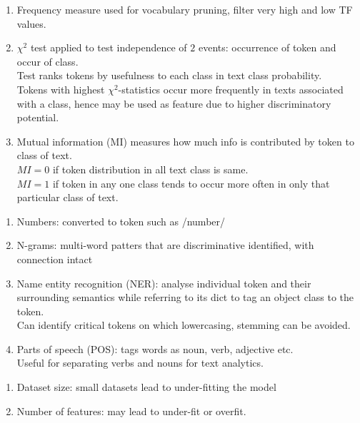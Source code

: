 \begin{remark} 
\begin{enumerate}[label=\roman*.]
\setlength{\itemsep}{0pt}
\item Frequency measure used for vocabulary pruning, filter very high and low TF values.
\item $\chi^2$ test applied to test independence of $2$ events: occurrence of token and occur of class.\\
Test ranks tokens by usefulness to each class in text class probability.\\
Tokens with highest $\chi^2$-statistics occur more frequently in texts associated with a class, hence may be used as feature due to higher discriminatory potential.
\item Mutual information (MI) measures how much info is contributed by token to class of text.\\
$MI = 0$ if token distribution in all text class is same.\\
$MI = 1$ if token in any one class tends to occur more often in only that particular class of text.
\end{enumerate}
\end{remark}

\begin{remark} 
\begin{enumerate}[label=\roman*.]
\setlength{\itemsep}{0pt}
\item Numbers: converted to token such as /number/
\item N-grams: multi-word patters that are discriminative identified, with connection intact
\item Name entity recognition (NER): analyse individual token and their surrounding semantics while referring to its dict to tag an object class to the token.\\
Can identify critical tokens on which lowercasing, stemming can be avoided.
\item Parts of speech (POS): tags words as noun, verb, adjective etc.\\
Useful for separating verbs and nouns for text analytics.
\end{enumerate}
\end{remark}

\begin{remark} 
\begin{enumerate}[label=\roman*.]
\setlength{\itemsep}{0pt}
\item Dataset size: small datasets lead to under-fitting the model
\item Number of features: may lead to under-fit or overfit.
\end{enumerate}
\end{remark}

